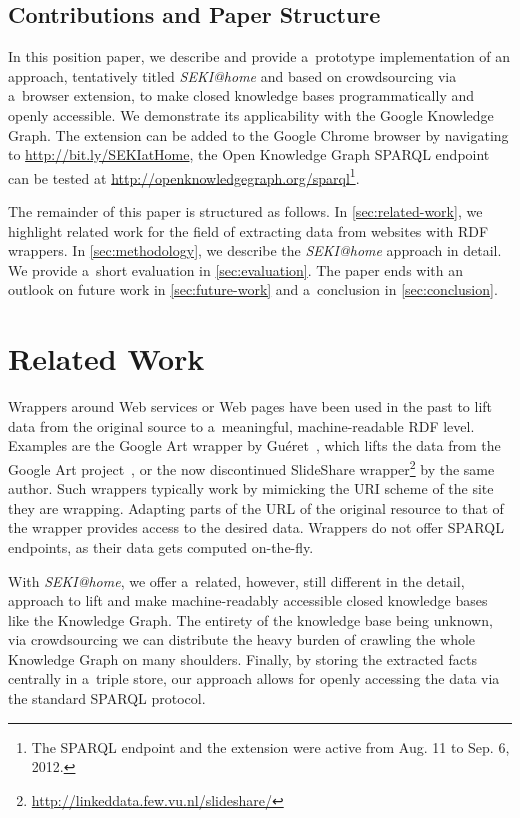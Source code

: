 \documentclass[runningheads,a4paper]{llncs}
\begin{document}
\subsection{Contributions and Paper Structure}
In this position paper, we describe and provide a~prototype implementation
of an approach, tentatively titled \emph{SEKI@home} and
based on crowdsourcing via a~browser extension,
to make closed knowledge bases programmatically and openly accessible.
We demonstrate its applicability with the Google Knowledge Graph.
The extension can be added to the Google Chrome browser by navigating to
\url{http://bit.ly/SEKIatHome},
the Open Knowledge Graph SPARQL endpoint can be tested at
\url{http://openknowledgegraph.org/sparql}\footnote{
The SPARQL endpoint and the extension were active from Aug. 11 to Sep. 6, 2012.}.

The remainder of this paper is structured as follows.
In \autoref{sec:related-work}, we highlight related work
for the field of extracting data from websites with RDF wrappers.
In \autoref{sec:methodology}, we describe the \emph{SEKI@home} approach in detail.
We provide a~short evaluation in \autoref{sec:evaluation}.
The paper ends with an outlook on future work in \autoref{sec:future-work}
and a~conclusion in \autoref{sec:conclusion}.

\section{Related Work} \label{sec:related-work}
Wrappers around Web services or Web pages have been used in the past
to lift data from the original source to a~meaningful, machine-readable RDF level.
Examples are the Google Art wrapper by Guéret~\cite{gueret2011},
which lifts the data from the Google Art project~\cite{sood2011},
or the now discontinued SlideShare wrapper\footnote{\url{http://linkeddata.few.vu.nl/slideshare/}} by the same author.
Such wrappers typically work by mimicking the URI scheme of the site they are wrapping.
Adapting parts of the URL of the original resource to that of the wrapper
provides access to the desired data.
Wrappers do not offer SPARQL endpoints, as their data gets computed on-the-fly.

With \emph{SEKI@home}, we offer a~related, however, still different in the detail,
approach to lift and make machine-readably accessible
closed knowledge bases like the Knowledge Graph.
The entirety of the knowledge base being unknown,
via crowdsourcing we can distribute the heavy burden
of crawling the whole Knowledge Graph on many shoulders.
Finally, by storing the extracted facts centrally in a~triple store,
our approach allows for openly accessing the data via the standard SPARQL protocol.
\end{document}

